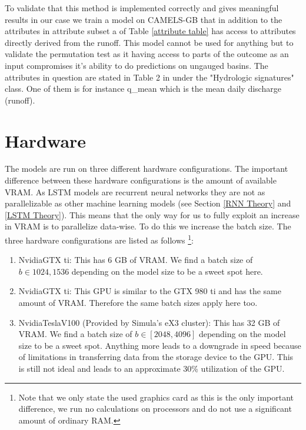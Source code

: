 To validate that this method is implemented correctly and gives meaningful results 
in our case we train a model on CAMELS-GB that in addition to the attributes in 
attribute subset a of Table \ref{attribute table} has access to attributes directly 
derived from the runoff. This model cannot be used for anything but to validate 
the permutation test as it having access to parts of the outcome as an input 
compromises it's ability to do predictions on ungauged basins.  The attributes in 
question are stated in Table 2 in \citet{CAMELS_GB} under the "Hydrologic signatures" 
class. One of them is for instance q\_mean which is the mean daily discharge (runoff).
\section{Hardware}
The models are run on three different hardware configurations. The important difference 
between these hardware configurations is the amount of available VRAM. As LSTM models 
are recurrent neural networks they are not as parallelizable as other machine learning 
models (see Section \ref{RNN Theory} and \ref{LSTM Theory}). This means that the only way for us to fully exploit 
an increase in VRAM is to parallelize data-wise. To do this we increase the batch size.
The three hardware configurations are listed as follows \footnote{Note that we only 
state the used graphics card as this is the only important difference, we run no 
calculations on processors and do not use a significant amount of ordinary RAM.}:
\begin{enumerate}
    \item Nvidia\textregistered  GTX ti: This has 6 GB of VRAM. We find a batch size of $b\in{1024, 1536}$ 
     depending on the model size to be a sweet spot here.
    \item Nvidia\textregistered   GTX ti: This GPU is similar to the GTX 980 ti and has the 
        same amount of VRAM. Therefore the same batch sizes apply here too.
    \item Nvidia\textregistered   Tesla\texttrademark  V100 (Provided by Simula's eX3 cluster): This has 32 GB of VRAM. 
        We find a batch size of $b\in[2048,4096]$ depending on the model size
        to be a sweet spot. Anything more leads to a downgrade in speed because 
        of limitations in transferring data from the storage device to the GPU. 
        This is still not ideal and leads to an approximate 30\% utilization of the 
        GPU.
\end{enumerate}

